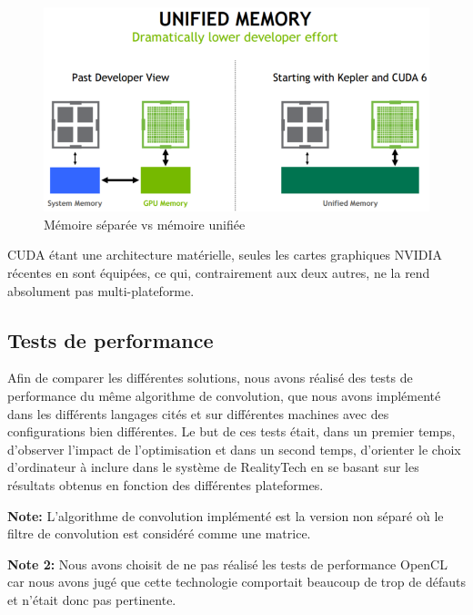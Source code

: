 \begin{figure}[H]
\centering
\includegraphics[width=0.65\linewidth]{images/cuda-unified-memory}
\caption{Mémoire séparée vs mémoire unifiée\protect\footnotemark}
\label{fig:cuda:unifiedmemory}
\end{figure}

CUDA étant une architecture matérielle, seules les cartes graphiques NVIDIA récentes en sont équipées, ce qui, contrairement aux deux autres, ne la rend absolument pas multi-plateforme.

\subsection{Tests de performance}
\label{sub:conv:bench}
Afin de comparer les différentes solutions, nous avons réalisé des tests de performance du même algorithme de convolution, que nous avons implémenté dans les différents langages cités et sur différentes machines avec des configurations bien différentes. Le but de ces tests était, dans un premier temps, d'observer l'impact de l'optimisation et dans un second temps, d'orienter le choix d'ordinateur à inclure dans le système de RealityTech en se basant sur les résultats obtenus en fonction des différentes plateformes.

\textbf{Note:} L'algorithme de convolution implémenté est la version non séparé où le filtre de convolution est considéré comme une matrice.

\textbf{Note 2:} Nous avons choisit de ne pas réalisé les tests de performance OpenCL car nous avons jugé que cette technologie comportait beaucoup de trop de défauts et n'était donc pas pertinente.

